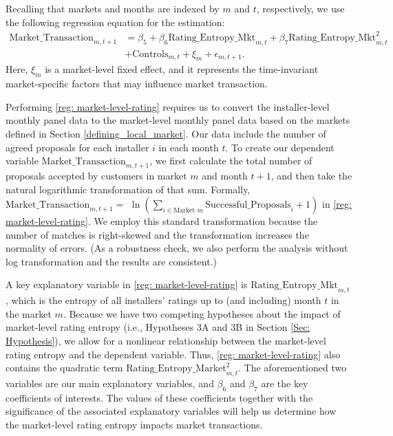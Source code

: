 \documentclass[msom,blindrev]{informs3}
\begin{document}
	
	
	Recalling that markets and months are indexed by $m$ and $t$, respectively, we use the following regression equation for the estimation:
	\begin{align} \nonumber
	\text{Market\_Transaction}_{m,t+1} & =\beta_{5} + \beta_{6} \text{Rating\_Entropy\_Mkt}_{m,t}+ \beta_{7} \text{Rating\_Entropy\_Mkt}_{m,t}^2\\ \label{reg: market-level-rating}
	&+ \text{Controls}_{m,t}  + \xi_{m} + \epsilon_{m,t+1}.
	\end{align}
	Here, $\xi_{m}$ is a market-level fixed effect, and it represents the time-invariant market-specific factors that may influence market transaction.

	Performing \eqref{reg: market-level-rating} requires us to convert the installer-level monthly panel data to the market-level monthly panel data based on the markets defined in Section \ref{defining_local_market}. Our data include the number of agreed proposals for each installer $i$ in each month $t$. To create our dependent variable $\text{Market\_Transaction}_{m,t+1}$, we first calculate the total number of proposals accepted by customers in market $m$ and month $t+1$, and then take the natural logarithmic transformation of that sum. Formally, $\text{Market\_Transaction}_{m,t+1} =$ $\ln\left( \sum_{i \in \text{Market\ } m} \text{Successful\_Proposals}_{i}+ 1 \right)$ in \eqref{reg: market-level-rating}.  We employ this standard transformation because the number of matches is right-skewed and the transformation increases the normality of errors. (As a robustness check, we also perform the analysis without log transformation and the results are consistent.)
	
	A key explanatory variable in \eqref{reg: market-level-rating} is $\text{Rating\_Entropy\_Mkt}_{m,t}$, which is the entropy of all installers' ratings up to (and including) month $t$ in the market $m$.
	Because we have two competing hypotheses about the impact of market-level rating entropy (i.e., Hypotheses 3A and 3B in Section \ref{Sec: Hypothesis}), we allow for a  nonlinear relationship between the market-level rating entropy and the dependent variable. Thus, \eqref{reg: market-level-rating} also contains the quadratic term  $\text{Rating\_Entropy\_Market}_{m,t}^{2}$. The aforementioned two variables are our main explanatory variables, and $\beta_{6}$ and $\beta_{7}$ are the key coefficients of interests. The values of these coefficients together with the significance of the associated explanatory variables will help us determine how the market-level rating entropy impacts market transactions.
	
\end{document}
